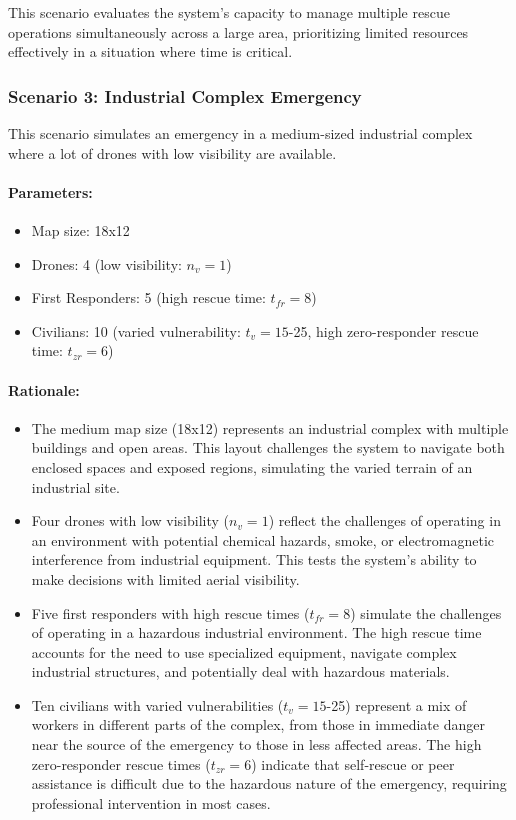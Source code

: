 This scenario evaluates the system's capacity to manage multiple rescue operations simultaneously across a large area, prioritizing limited resources effectively in a situation where time is critical.

\subsubsection{Scenario 3: Industrial Complex Emergency}

This scenario simulates an emergency in a medium-sized industrial complex where a lot of drones with low visibility are available.

\paragraph{Parameters:}
\begin{itemize}
	\item Map size: 18x12
	\item Drones: 4 (low visibility: $n_v = 1$)
	\item First Responders: 5 (high rescue time: $t_{fr} = 8$)
	\item Civilians: 10 (varied vulnerability: $t_v = 15$-25, high zero-responder rescue time: $t_{zr} = 6$)
\end{itemize}

\paragraph{Rationale:}
\begin{itemize}
	\item The medium map size (18x12) represents an industrial complex with multiple buildings and open areas. This layout challenges the system to navigate both enclosed spaces and exposed regions, simulating the varied terrain of an industrial site.
	\item Four drones with low visibility ($n_v = 1$) reflect the challenges of operating in an environment with potential chemical hazards, smoke, or electromagnetic interference from industrial equipment. This tests the system's ability to make decisions with limited aerial visibility.
	\item Five first responders with high rescue times ($t_{fr} = 8$) simulate the challenges of operating in a hazardous industrial environment. The high rescue time accounts for the need to use specialized equipment, navigate complex industrial structures, and potentially deal with hazardous materials.
	\item Ten civilians with varied vulnerabilities ($t_v = 15$-25) represent a mix of workers in different parts of the complex, from those in immediate danger near the source of the emergency to those in less affected areas. The high zero-responder rescue times ($t_{zr} = 6$) indicate that self-rescue or peer assistance is difficult due to the hazardous nature of the emergency, requiring professional intervention in most cases.
\end{itemize}

